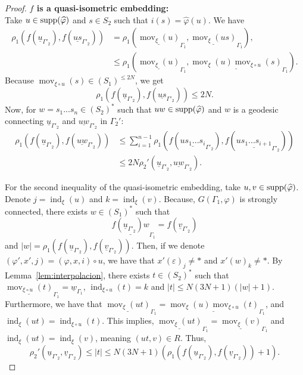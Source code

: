 \documentclass{article}
\theoremstyle{definition}
\theoremstyle{definition}
\newcommand{\mov}{\operatorname{mov}}
\newcommand{\ind}{\operatorname{ind}}
\newcommand{\supp}{\textnormal{supp}}
\begin{document}
\begin{proof}
\noindent
\textbf{$f$ is a quasi-isometric embedding:} \\
Take $u\in\supp(\widehat{\varphi})$ and $s\in S_2$ such that $i(s) = \widehat{\varphi}(u)$. We have 
\begin{align*}
    \rho_1(f(\underline{u}_{\Gamma'_2}), f(\underline{us}_{\Gamma'_2})) &= \rho_1\!\left(\underline{\mov_{\xi}(u)}_{\Gamma_1}, \underline{\mov_{\xi}(us)}_{\Gamma_1}\right),\\
    &\leq\rho_1\!\left(\underline{\mov_{\xi}(u)}_{\Gamma_1}, \underline{\mov_{\xi}(u)\mov_{{\xi}\circ u}(s)}_{\Gamma_1}\right).
\end{align*}
Because $\mov_{{\xi}\circ u}(s)\in (S_1)^{\leq 2N}$, we get
$$\rho_1(f(\underline{u}_{\Gamma'_2}), f(\underline{us}_{\Gamma'_2}))\leq 2N.$$
Now, for $w = s_1 ... s_n\in (S_2)^*$ such that $uw\in\supp(\widehat{\varphi})$ and $w$ is a geodesic connecting $\underline{u}_{\Gamma'_2}$ and $\underline{uw}_{\Gamma'_2}$ in $\Gamma_2'$:
\begin{align*}
    \rho_1(f(\underline{u}_{\Gamma'_2}), f(\underline{uw}_{\Gamma'_2})) &\leq \sum_{i=1}^{n-1}\rho_1\!\left(f(\underline{us_1 ... s_i}_{\Gamma'_2}), f(\underline{us_1 ... s_{i+1}}_{\Gamma'_2})\right)\\
    &\leq 2N\rho_2'(\underline{u}_{\Gamma'_2},\underline{uw}_{\Gamma'_2}).
\end{align*}

For the second inequality of the quasi-isometric embedding, take $u, v\in \supp(\widehat{\varphi})$. Denote $j = \ind_{\xi}(u)$ and $k = \ind_{\xi}(v)$. Because, $G(\Gamma_1, \varphi)$ is strongly connected, there exists $w\in (S_1)^*$ such that \[\underline{f(\underline{u}_{\Gamma'_2})w}_{\Gamma_1} = f(\underline{v}_{\Gamma'_2})\]and $|w| = \rho_1(f(\underline{u}_{\Gamma'_2}), f(\underline{v}_{\Gamma'_2}))$. Then, if we denote $(\varphi', x', j) = (\varphi, x, i)\circ u$, we have that $x'(\varepsilon)_j\neq \ast$ and $x'(w)_k \neq\ast$. By Lemma~\ref{lem:interpolacion}, there exists $t\in (S_2)^*$ such that $\underline{\mov_{{\xi}\circ u}(t)}_{\Gamma_1} = \underline{w}_{\Gamma_1}$, $\ind_{{\xi}\circ u}(t) = k$ and $|t|\leq N(3N+1)(|w|+1)$. Furthermore,
we have that $\underline{\mov_{\xi}(ut)}_{\Gamma_1} = \underline{\mov_{\xi}(u)\mov_{{\xi}\circ u}(t)}_{\Gamma_1}$, and $\ind_{\xi}(ut)=\ind_{{\xi}\circ u}(t)$. This implies, $\underline{\mov_{\xi}(ut)}_{\Gamma_1} = \underline{\mov_{\xi}(v)}_{\Gamma_1}$ and $\ind_{\xi}(ut)=\ind_{\xi}(v)$, meaning $(ut,v)\in R$. Thus,
$$\rho_2'(\underline{u}_{\Gamma'_2},\underline{v}_{\Gamma'_2})\leq |t| \leq N(3N+1)(\rho_1(f(\underline{u}_{\Gamma'_2}), f(\underline{v}_{\Gamma'_2}))+1).$$


\end{proof}
\end{document}
